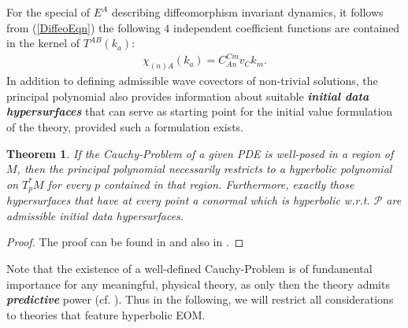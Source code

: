 \documentclass[%
preprint,
titlepage,
nofootinbib,
amsmath,amssymb,
showkeys,
aps,
prd,
floatfix,
]{revtex4-2}
\newtheorem{theorem}{Theorem}
\begin{document}
For the special of $E^A$ describing diffeomorphism invariant dynamics, it follows from (\ref{DiffeoEqn}) the following $4$ independent coefficient functions are contained in the kernel  of $T^{AB}(k_a)$: 
\begin{align}
   \chi_{(n)A}(k_a) =  C_{An}^{Cm}v_Ck_m.
\end{align}
In addition to defining admissible wave covectors of non-trivial solutions, the principal polynomial also provides information about suitable \textit{\textbf{initial data hypersurfaces}} that can serve as starting point for the initial value formulation of the theory, provided such a formulation exists.
\begin{theorem}
If the Cauchy-Problem of a given PDE is well-posed in a region of $M$, then the principal polynomial necessarily restricts to a hyperbolic polynomial on $T_p^{\ast}M$ for every $p$ contained in that region. Furthermore, exactly those hypersurfaces that have at every point a conormal which is hyperbolic w.r.t. $\mathcal{P}$ are admissible initial data hypersurfaces.
\end{theorem}
\begin{proof}
The proof can be found in \cite{Hormander1977} and also in \cite{Ivrii_1974}.
\end{proof}
Note that the existence of a well-defined Cauchy-Problem is of fundamental importance for any meaningful, physical theory, as only then the theory admits \textit{\textbf{predictive}} power (cf. \cite{Rivera}).  Thus in the following, we will restrict all considerations to theories that feature hyperbolic EOM.
\end{document}
